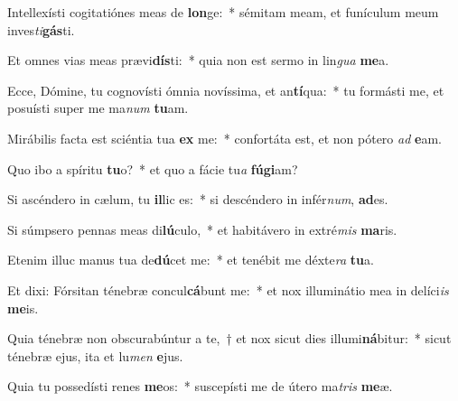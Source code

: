 \item Intellexísti cogitatiónes meas de \textbf{lon}ge:~* sémitam meam, et funículum meum inves\textit{ti}\textbf{gás}ti.
\item Et omnes vias meas prævi\textbf{dís}ti:~* quia non est sermo in lin\textit{gua} \textbf{me}a.
\item Ecce, Dómine, tu cognovísti ómnia novíssima, et an\textbf{tí}qua:~* tu formásti me, et posuísti super me ma\textit{num} \textbf{tu}am.
\item Mirábilis facta est sciéntia tua \textbf{ex} me:~* confortáta est, et non pótero \textit{ad} \textbf{e}am.
\item Quo ibo a spíritu \textbf{tu}o?~* et quo a fácie tu\textit{a} \textbf{fú}\textbf{gi}am?
\item Si ascéndero in cælum, tu \textbf{il}lic es:~* si descéndero in infér\textit{num}, \textbf{ad}es.
\item Si súmpsero pennas meas di\textbf{lú}culo,~* et habitávero in extré\textit{mis} \textbf{ma}ris.
\item Etenim illuc manus tua de\textbf{dú}cet me:~* et tenébit me déxte\textit{ra} \textbf{tu}a.
\item Et dixi: Fórsitan ténebræ concul\textbf{cá}bunt me:~* et nox illuminátio mea in delíci\textit{is} \textbf{me}is.
\item Quia ténebræ non obscurabúntur a te,~† et nox sicut dies illumi\textbf{ná}bitur:~* sicut ténebræ ejus, ita et lu\textit{men} \textbf{e}jus.
\item Quia tu possedísti renes \textbf{me}os:~* suscepísti me de útero ma\textit{tris} \textbf{me}æ.

